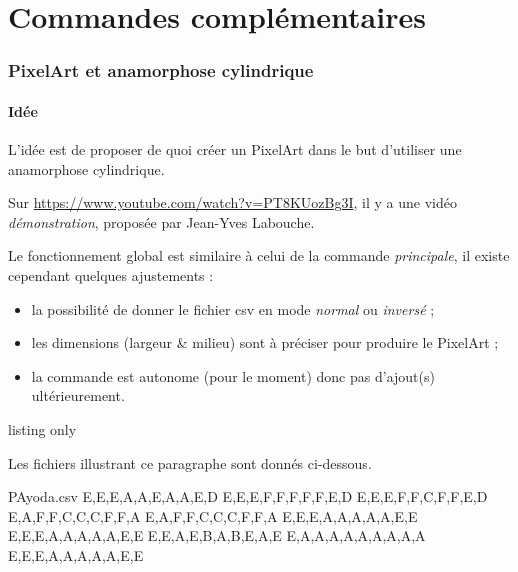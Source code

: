 \documentclass{article}
\begin{document}
\pagebreak

\begin{PresentationCode}{}
\end{PresentationCode}

\newpage

\part{Commandes complémentaires}

\section{PixelArt et anamorphose cylindrique}

\subsection{Idée}

L'idée est de proposer de quoi créer un PixelArt dans le but d'utiliser une anamorphose cylindrique.

Sur \url{https://www.youtube.com/watch?v=PT8KUozBg3I}, il y a une vidéo \textit{démonstration}, proposée par Jean-Yves Labouche.

Le fonctionnement global est similaire à celui de la commande \textit{principale}, il existe cependant quelques ajustements :

\begin{itemize}
	\item la possibilité de donner le fichier \textsf{csv} en mode \textit{normal} ou \textit{inversé} ;
	\item les dimensions (largeur \& milieu) sont à préciser pour produire le PixelArt ;
	\item la commande est autonome (pour le moment) donc pas d'ajout(s) ultérieurement.
\end{itemize}

\begin{PresentationCode}{listing only}
\end{PresentationCode}

Les fichiers illustrant ce paragraphe sont donnés ci-dessous.

\begin{PresentationCode}{}
\begin{filecontents*}[overwrite]{PAyoda.csv}
E,E,E,A,A,E,A,A,E,D
E,E,E,F,F,F,F,F,E,D
E,E,E,F,F,C,F,F,E,D
E,A,F,F,C,C,C,F,F,A
E,A,F,F,C,C,C,F,F,A
E,E,E,A,A,A,A,A,E,E
E,E,E,A,A,A,A,A,E,E
E,E,A,E,B,A,B,E,A,E
E,A,A,A,A,A,A,A,A,A
E,E,E,A,A,A,A,A,E,E
\end{filecontents*}

\end{PresentationCode}
\end{document}
